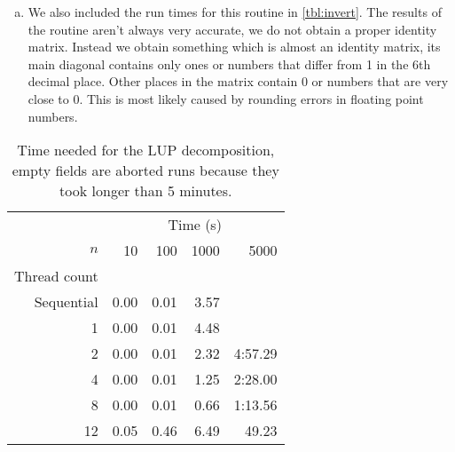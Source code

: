 \documentclass[a4paper]{article}
\begin{document}
\begin{enumerate}[(a)]
	Run times for the code are shown in \autoref{tbl:invert}, the run time also includes the parallel multiplication routine. We also included using 10 threads to investigate why 12 threads has longer run times than lower thread counts. We removed the $5000 \times 5000$ problem because the time to complete that problem took longer than 5 minutes no matter the amount of threads used.
	
	We can see that the trend in \autoref{tbl:invert} is the same as in \autoref{tbl:lup}, when the number of threads is doubled then the run time is nearly cut in half. The only exception to this are 10 and 12 threads. Both of these show a slowdown for $n=10, n=100$, this slowdown is most likely caused by the overhead of creating and managing the respective number of threads while the amount of work doesn't justify that amount of threads. This means that more time is spend on managing the work instead of on doing the actual work. With 10 threads the amount of work to do for $n=1000$ is still sufficient to have a speed up but with 12 threads there is still too much overhead to see a speed up.
	
	\item We also included the run times for this routine in \autoref{tbl:invert}. The results of the routine aren't always very accurate, we do not obtain a proper identity matrix. Instead we obtain something which is almost an identity matrix, its main diagonal contains only ones or numbers that differ from 1 in the 6th decimal place. Other places in the matrix contain 0 or numbers that are very close to 0. This is most likely caused by rounding errors in floating point numbers.
\end{enumerate}

\begin{table}
	\centering
	\caption{Time needed for the LUP decomposition, empty fields are aborted runs because they took longer than 5 minutes.}
	\label{tbl:lup}
	\begin{tabular}{r|r|r|r|r}
		& \multicolumn{4}{c}{Time (s)} \\
		$n$ & 10 & 100 & 1000 & 5000 \\ \hline
		Thread count \\ \cline{2-5}
		Sequential & 0.00  & 0.01 & 3.57 & \\
		 1 & 0.00 & 0.01 & 4.48 &  \\
		 2 & 0.00 & 0.01 & 2.32 & 4:57.29 \\
		 4 & 0.00 & 0.01 & 1.25 & 2:28.00 \\
		 8 & 0.00 & 0.01 & 0.66 & 1:13.56 \\
		12 & 0.05 & 0.46 & 6.49 & 49.23 \\
	\end{tabular}
\end{table}
\end{document}
